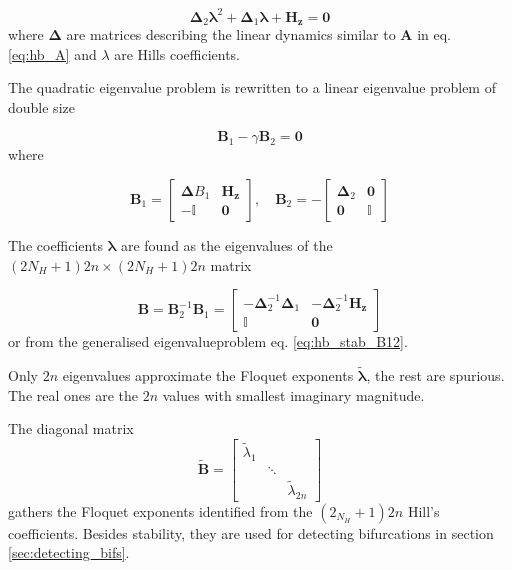 \begin{equation}
  \label{eq:hb_quad_eigen}
  \bm \Delta_2 \bm \lambda^2 + \bm \Delta_1 \bm \lambda + \bm H_{\bm z} = \bm 0
\end{equation}
where $\bm \Delta$ are matrices describing the linear dynamics similar to $\bm
A$ in eq. \eqref{eq:hb_A} and $\lambda$ are Hills coefficients.

The quadratic eigenvalue problem is rewritten to a linear eigenvalue problem of
double size

\begin{equation}
  \label{eq:hb_double_eigen}
  \bm B_1 - \gamma \bm B_2 = \bm 0
\end{equation}
where

\begin{equation}
  \label{eq:hb_stab_B12}
  \bm B_1 =
  \begin{bmatrix}
    \bm \Delta B_1 & \bm H_{\bm z} \\
    -\mathbb{I}    & \bm 0
  \end{bmatrix}, \quad
  \bm B_2 = -
  \begin{bmatrix}
    \bm \Delta_2   & \bm 0 \\
    \bm 0          & \mathbb{I}
  \end{bmatrix}
\end{equation}

The coefficients $\bm \lambda$ are found as the eigenvalues of the $(2N_H+1)2n
\times (2N_H+1)2n$ matrix

\begin{equation}
  \label{eq:hb_B}
  \bm B = \bm B^{-1}_2 \bm B_1 =
  \begin{bmatrix}
    -\bm \Delta^{-1}_2 \bm\Delta_1 & -\bm \Delta^{-1}_2 \bm H_{\bm z} \\
    \mathbb{I}                    & \bm 0
  \end{bmatrix}
\end{equation}
or from the generalised eigenvalueproblem eq. \eqref{eq:hb_stab_B12}.

Only $2n$ eigenvalues approximate the Floquet exponents $\tilde{\bm \lambda}$,
the rest are spurious. The real ones are the $2n$ values with smallest imaginary
magnitude.

The diagonal matrix
\begin{equation}
  \label{eq:hb_B_tilde}
  \tilde{\bm B} =
  \begin{bmatrix}
    \tilde \lambda_1 \\
    & \ddots \\
    & & \tilde \lambda_{2n}
  \end{bmatrix}
\end{equation}
gathers the Floquet exponents identified from the $(2_{N_H} + 1)2n$ Hill's
coefficients. Besides stability, they are used for detecting bifurcations in
section \ref{sec:detecting_bifs}.

